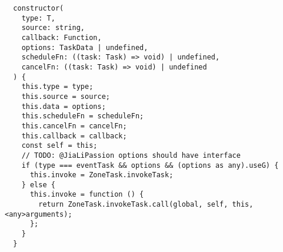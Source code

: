 \begin{verbatim}
  constructor(
    type: T,
    source: string,
    callback: Function,
    options: TaskData | undefined,
    scheduleFn: ((task: Task) => void) | undefined,
    cancelFn: ((task: Task) => void) | undefined
  ) {
    this.type = type;
    this.source = source;
    this.data = options;
    this.scheduleFn = scheduleFn;
    this.cancelFn = cancelFn;
    this.callback = callback;
    const self = this;
    // TODO: @JiaLiPassion options should have interface
    if (type === eventTask && options && (options as any).useG) {
      this.invoke = ZoneTask.invokeTask;
    } else {
      this.invoke = function () {
        return ZoneTask.invokeTask.call(global, self, this, <any>arguments);
      };
    }
  }
\end{verbatim}
